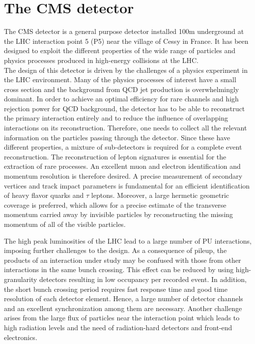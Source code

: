 \section{The CMS detector}
\label{sec:CMSdetector}

The CMS detector is a general purpose detector installed 100\unit{m} underground at the LHC interaction point 5 (P5) near the village of Cessy in France.
It has been designed to exploit the different properties of the wide range of particles and physics processes produced in high-energy collisions at the LHC.\\

The design of this detector is driven by the challenges of a physics experiment in the LHC environment. 
Many of the physics processes of interest have a small cross section and the background from QCD jet production is overwhelmingly dominant.
In order to achieve an optimal efficiency for rare channels and high rejection power for QCD background, the detector has to be able to reconstruct the primary interaction entirely
and to reduce the influence of overlapping interactions on its reconstruction.
Therefore, one needs to collect all the relevant information on the particles passing through the detector. Since these have different properties, a mixture of sub-detectors is required for a complete event reconstruction. The reconstruction of lepton signatures is essential for the extraction of rare processes. An excellent muon and electron identification and momentum resolution is therefore desired. A precise measurement of secondary vertices and track impact parameters is fundamental for an efficient identification of heavy flavor quarks and $\tau$ leptons. Moreover, a large hermetic geometric coverage is preferred, which allows for a precise estimate of the transverse momentum carried away by invisible particles by reconstructing the missing momentum of all of the visible particles.

The high peak luminosities of the LHC lead to a large number of PU interactions, imposing further challenges to the design. As a consequence of pileup, the products of an interaction under study may be confused with those from other interactions in the same bunch crossing. This effect can be reduced by using high-granularity detectors resulting in low occupancy per recorded event. In addition, the short bunch crossing period requires fast response time and good time resolution of each detector element.
Hence, a large number of detector channels and an excellent synchronization among them are necessary. Another challenge arises from the large flux of particles near the interaction point which leads to high radiation levels and the need of radiation-hard detectors and front-end electronics.\\


